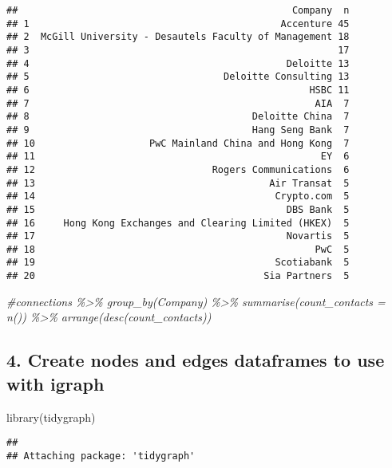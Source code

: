 \documentclass[
]{article}
\newenvironment{Shaded}{\begin{snugshade}}{\end{snugshade}}
\newcommand{\CommentTok}[1]{\textcolor[rgb]{0.56,0.35,0.01}{\textit{#1}}}
\newcommand{\FunctionTok}[1]{\textcolor[rgb]{0.00,0.00,0.00}{#1}}
\newcommand{\NormalTok}[1]{#1}
\begin{document}
\begin{verbatim}
##                                                Company  n
## 1                                            Accenture 45
## 2  McGill University - Desautels Faculty of Management 18
## 3                                                      17
## 4                                             Deloitte 13
## 5                                  Deloitte Consulting 13
## 6                                                 HSBC 11
## 7                                                  AIA  7
## 8                                       Deloitte China  7
## 9                                       Hang Seng Bank  7
## 10                    PwC Mainland China and Hong Kong  7
## 11                                                  EY  6
## 12                               Rogers Communications  6
## 13                                         Air Transat  5
## 14                                          Crypto.com  5
## 15                                            DBS Bank  5
## 16     Hong Kong Exchanges and Clearing Limited (HKEX)  5
## 17                                            Novartis  5
## 18                                                 PwC  5
## 19                                          Scotiabank  5
## 20                                        Sia Partners  5
\end{verbatim}

\begin{Shaded}
\begin{Highlighting}[]
\CommentTok{\#connections \%\textgreater{}\% group\_by(Company) \%\textgreater{}\% summarise(count\_contacts = n()) \%\textgreater{}\%  arrange(desc(count\_contacts)) }
\end{Highlighting}
\end{Shaded}

\hypertarget{create-nodes-and-edges-dataframes-to-use-with-igraph}{%
\subsection{4. Create nodes and edges dataframes to use with
igraph}\label{create-nodes-and-edges-dataframes-to-use-with-igraph}}

\begin{Shaded}
\begin{Highlighting}[]
\FunctionTok{library}\NormalTok{(tidygraph)}
\end{Highlighting}
\end{Shaded}

\begin{verbatim}
## 
## Attaching package: 'tidygraph'
\end{verbatim}
\end{document}
